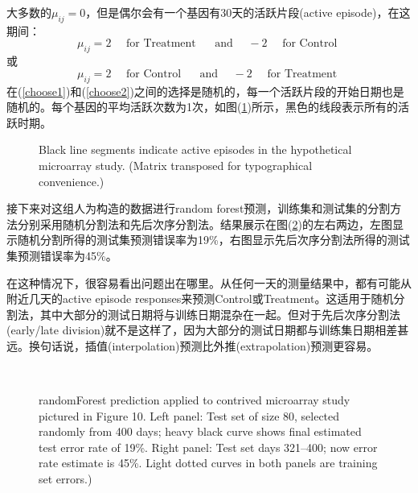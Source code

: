 \documentclass[lang=cn,11pt,a4paper,cite=authoryear]{elegantpaper}
\begin{document}
大多数的$\mu_{ij}=0$，但是偶尔会有一个基因有30天的活跃片段(active episode)，在这期间：
\begin{equation}
\label{choose1}
\mu_{i j}=2 \quad \text { for Treatment } \quad \text { and } \quad-2 \quad \text { for Control }
\end{equation}
或
\begin{equation}
\label{choose2}
\mu_{i j}=2 \quad \text { for Control } \quad \text { and } \quad-2 \quad \text { for Treatment }
\end{equation}
在(\ref{choose1})和(\ref{choose2})之间的选择是随机的，每一个活跃片段的开始日期也是随机的。每个基因的平均活跃次数为1次，如图(\ref{fig10})所示，黑色的线段表示所有的活跃时期。
\begin{figure}[H]
		\centering
		\caption{Black line segments indicate active episodes in the hypothetical microarray study. (Matrix transposed for typographical convenience.)}
		\label{fig10}
\end{figure}

接下来对这组人为构造的数据进行random forest预测，训练集和测试集的分割方法分别采用随机分割法和先后次序分割法。结果展示在图(\ref{fig11})的左右两边，左图显示随机分割所得的测试集预测错误率为19\%，右图显示先后次序分割法所得的测试集预测错误率为45\%。

在这种情况下，很容易看出问题出在哪里。从任何一天的测量结果中，都有可能从附近几天的active episode responses来预测Control或Treatment。这适用于随机分割法，其中大部分的测试日期将与训练日期混杂在一起。但对于先后次序分割法(early/late division)就不是这样了，因为大部分的测试日期都与训练集日期相差甚远。换句话说，插值(interpolation)预测比外推(extrapolation)预测更容易。

\begin{figure}[H]
		\centering
		\\
		\caption{randomForest prediction applied to contrived microarray study pictured in Figure 10. Left panel: Test set of size 80, selected randomly from 400 days; heavy black curve shows final estimated test error rate of 19\%. Right panel: Test set days 321–400; now error rate estimate is 45\%. Light dotted curves in both panels are training set errors.)}
		\label{fig11}
\end{figure}
\end{document}

